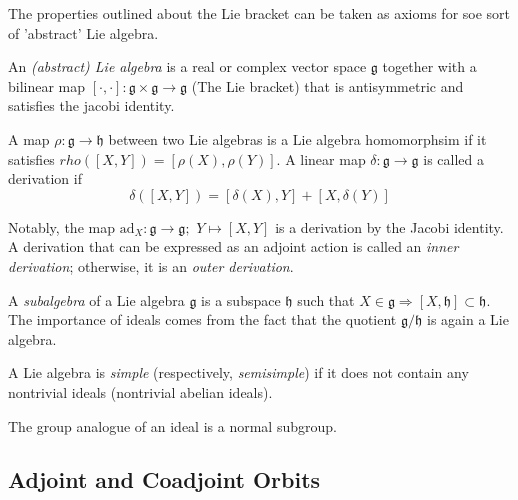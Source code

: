 \indent The properties outlined about the Lie bracket can be taken as axioms for soe sort of 'abstract' Lie algebra.


\begin{defn}

	An \textit{(abstract) Lie algebra} is a real or complex vector space $\mathfrak{g}$ together with a bilinear map $ [\cdot,\cdot]: \mathfrak{g} \times \mathfrak{g} \to \mathfrak{g}$ (The Lie bracket) that is antisymmetric and satisfies the jacobi identity.

\end{defn}


\begin{defn}

	A map $ \rho: \mathfrak{g} \to \mathfrak{h}$ between two Lie algebras is a Lie algebra homomorphsim if it satisfies $rho([X,Y]) = [\rho (X),\rho (Y)]$. A linear map $ \delta: \mathfrak{g} \to \mathfrak{g}$ is called a derivation if 
	\[ \delta([X,Y]) = [ \delta(X),Y]+[X,\delta(Y)]	\]


Notably, the map $\mathrm{ad}_X: \mathfrak{g} \to \mathfrak{g}; \hspace{4pt} Y \mapsto [X,Y]$ is a derivation by the Jacobi identity. A derivation that can be expressed as an adjoint action is called an \textit{inner derivation}; otherwise, it is an \textit{outer derivation}. 
\end{defn}


\begin{defn}

	A \textit{subalgebra} of a Lie algebra $ \mathfrak{g}$ is a subspace $ \mathfrak{h}$ such that $X \in \mathfrak{g} \Rightarrow [X, \mathfrak{h}] \subset \mathfrak{h}$. The importance of ideals comes from the fact that the quotient $ \mathfrak{g}/ \mathfrak{h}$ is again a Lie algebra.

\end{defn}



\begin{defn}

	A Lie algebra is \textit{simple} (respectively, \textit{semisimple}) if it does not contain any nontrivial ideals (nontrivial abelian ideals).

\end{defn}

\indent The group analogue of an ideal is a normal subgroup.


\subsection{Adjoint and Coadjoint Orbits}
